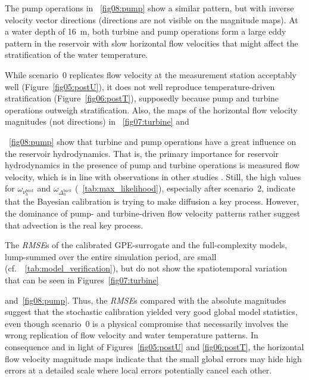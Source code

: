 \documentclass[draft,linenumbers,onecolumn]{agujournal2019} %
\begin{document}
The pump operations in \figurename{~\ref{fig08:pump}} show a similar pattern, but with inverse velocity vector directions (directions are not visible on the magnitude maps). At a water depth of 16~m, both turbine and pump operations form a large eddy pattern in the reservoir with slow horizontal flow velocities that might affect the stratification of the water temperature.

While scenario~0 replicates flow velocity at the measurement station acceptably well (Figure~\ref{fig05:postU}), it does not well reproduce temperature-driven stratification (Figure~\ref{fig06:postT}), supposedly because pump and turbine operations outweigh stratification. Also, the maps of the horizontal flow velocity magnitudes (not directions) in \figurename{~\ref{fig07:turbine}} and \figurename{~\ref{fig08:pump} show that turbine and pump operations have a great influence on the reservoir hydrodynamics. That is, the primary importance for reservoir hydrodynamics in the presence of pump and turbine operations is measured flow velocity, which is in line with observations in other studies \cite{muller_flow_2018}. Still, the high values for $\omega_{\nu_{h}^{back}}$ and $\omega_{\Delta_{h}^{back}}$ (\tablename{~\ref{tab:max_likelihood}}), especially after scenario~2, indicate that the Bayesian calibration is trying to make diffusion a key process. However, the dominance of pump- and turbine-driven flow velocity patterns rather suggest that advection is the real key process.

The \textit{RMSE}s of the calibrated GPE-surrogate and the full-complexity models, lump-summed over the entire simulation period, are small (cf.~\tablename{~\ref{tab:model_verification}}), but do not show the spatiotemporal variation that can be seen in Figures~\ref{fig07:turbine}} and~\ref{fig08:pump}. Thus, the \textit{RMSE}s compared with the absolute magnitudes suggest that the stochastic calibration yielded very good global model statistics, even though scenario~0 is a physical compromise that necessarily involves the wrong replication of flow velocity and water temperature patterns. In consequence and in light of Figures~\ref{fig05:postU} and \ref{fig06:postT}, the horizontal flow velocity magnitude maps indicate that the small global errors may hide high errors at a detailed scale where local errors potentially cancel each other.
\end{document}
